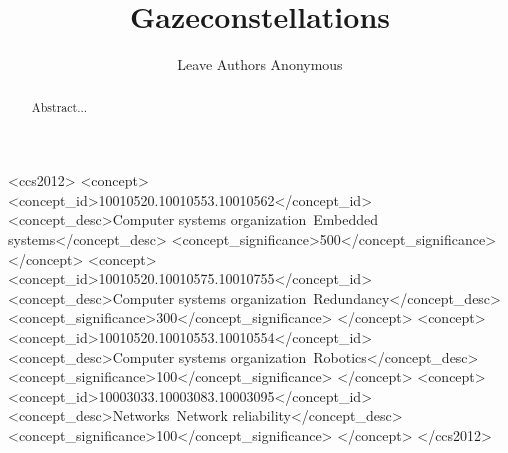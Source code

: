 \documentclass[sigchi, review]{acmart}
\begin{document}
\title{Gazeconstellations}

\author{Leave Authors Anonymous}

\renewcommand{\shortauthors}{B. Trovato et al.}


\begin{abstract}
Abstract...
\end{abstract}

%
%
\begin{CCSXML}
<ccs2012>
 <concept>
  <concept_id>10010520.10010553.10010562</concept_id>
  <concept_desc>Computer systems organization~Embedded systems</concept_desc>
  <concept_significance>500</concept_significance>
 </concept>
 <concept>
  <concept_id>10010520.10010575.10010755</concept_id>
  <concept_desc>Computer systems organization~Redundancy</concept_desc>
  <concept_significance>300</concept_significance>
 </concept>
 <concept>
  <concept_id>10010520.10010553.10010554</concept_id>
  <concept_desc>Computer systems organization~Robotics</concept_desc>
  <concept_significance>100</concept_significance>
 </concept>
 <concept>
  <concept_id>10003033.10003083.10003095</concept_id>
  <concept_desc>Networks~Network reliability</concept_desc>
  <concept_significance>100</concept_significance>
 </concept>
</ccs2012>
\end{CCSXML}






\maketitle

% 



\end{document}
